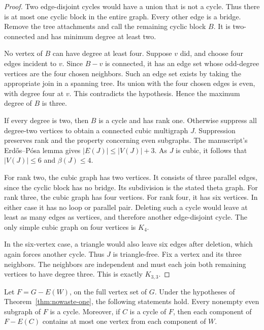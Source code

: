 \begin{proof}
Two edge-disjoint cycles would have a union that is not a cycle.
Thus there is at most one cyclic block in the entire graph.
Every other edge is a bridge.
Remove the tree attachments and call the remaining cyclic block $B$.
It is two-connected and has minimum degree at least two.

No vertex of $B$ can have degree at least four.
Suppose $v$ did, and choose four edges incident to $v$.
Since $B-v$ is connected, it has an edge set whose odd-degree vertices are the four chosen neighbors.
Such an edge set exists by taking the appropriate join in a spanning tree.
Its union with the four chosen edges is even, with degree four at $v$.
This contradicts the hypothesis.
Hence the maximum degree of $B$ is three.

If every degree is two, then $B$ is a cycle and has rank one.
Otherwise suppress all degree-two vertices to obtain a connected cubic multigraph $J$.
Suppression preserves rank and the property concerning even subgraphs.
The manuscript's Erd\H{o}s--P\'osa lemma gives
$|E(J)|\le|V(J)|+3$.
As $J$ is cubic, it follows that $|V(J)|\le6$ and $\beta(J)\le4$.

For rank two, the cubic graph has two vertices.
It consists of three parallel edges, since the cyclic block has no bridge.
Its subdivision is the stated theta graph.
For rank three, the cubic graph has four vertices.
For rank four, it has six vertices.
In either case it has no loop or parallel pair.
Deleting such a cycle would leave at least as many edges as vertices, and therefore another edge-disjoint cycle.
The only simple cubic graph on four vertices is $K_4$.

In the six-vertex case, a triangle would also leave six edges after deletion, which again forces another cycle.
Thus $J$ is triangle-free.
Fix a vertex and its three neighbors.
The neighbors are independent and must each join both remaining vertices to have degree three.
This is exactly $K_{3,3}$.
\end{proof}

\begin{lemma}\label{lem:nowaste-path-obstruction}
Let $F=G-E(W)$, on the full vertex set of $G$.
Under the hypotheses of Theorem~\ref{thm:nowaste-one}, the following statements hold.
Every nonempty even subgraph of $F$ is a cycle.
Moreover, if $C$ is a cycle of $F$, then each component of $F-E(C)$ contains at most one vertex from each component of $W$.
\end{lemma}

